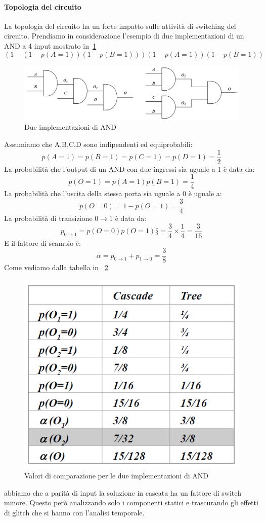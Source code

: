 \paragraph{Topologia del circuito} La topologia del circuito ha un forte impatto sulle attività di switching del circuito. Prendiamo in considerazione l'esempio di due implementazioni di un AND a 4 input mostrato in \figurename\,\ref{fig:and4input}
$$(1-(1-p(A = 1))(1-p(B = 1)))(1-p(A = 1))(1 - p(B = 1))$$
\begin{figure}
\centering
\includegraphics[scale=0.4]{img/and4input.png}
\caption{Due implementazioni di AND}\label{fig:and4input}
\end{figure}
Assumiamo che A,B,C,D sono indipendenti ed equiprobabili:
$$p(A = 1) = p(B = 1) = p(C = 1) = p(D = 1) = \frac{1}{2}$$
La probabilità che l'output di un AND con due ingressi sia uguale a 1 è data da:
$$p(O = 1) = p(A = 1)p(B = 1) = \frac{1}{4}$$
La probabilità che l'uscita della stessa porta sia uguale a 0 è uguale a:
$$p(O = 0) = 1-p(O = 1) = \frac{3}{4}$$
La probabilità di transizione $0 \rightarrow 1$ è data da:
$$p_{0\rightarrow 1}= p(O=0)p(O=1)§=\frac{3}{4}\times\frac{1}{4}=\frac{3}{16}$$
E il fattore di scambio è:
$$\alpha = p_{0\rightarrow 1} + p_{1\rightarrow 0} = \frac{3}{8}$$
Come vediamo dalla tabella in \figurename\, \ref{fig:2ANDimp}
\begin{figure}
\centering
\includegraphics[scale=0.5]{img/2ANDimp.png}
\caption{Valori di comparazione per le due implementazioni di AND}\label{fig:2ANDimp}
\end{figure}
abbiamo che a parità di input la soluzione in cascata ha un fattore di switch minore.
Questo però analizzando solo i componenti statici e trascurando gli effetti di glitch che si hanno con l'analisi temporale.
